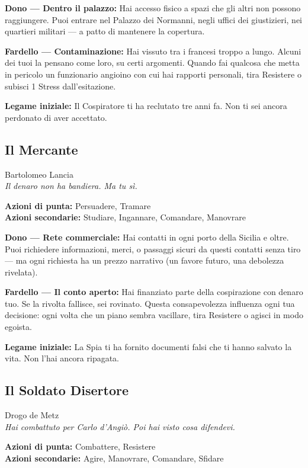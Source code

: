 \textbf{Dono — Dentro il palazzo:} Hai accesso fisico a spazi che gli
altri non possono raggiungere. Puoi entrare nel Palazzo dei Normanni,
negli uffici dei giustizieri, nei quartieri militari — a patto di
mantenere la copertura.

\textbf{Fardello — Contaminazione:} Hai vissuto tra i francesi troppo
a lungo. Alcuni dei tuoi la pensano come loro, su certi argomenti.
Quando fai qualcosa che metta in pericolo un funzionario angioino
con cui hai rapporti personali, tira Resistere o subisci 1 Stress
dall'esitazione.

\textbf{Legame iniziale:} Il Cospiratore ti ha reclutato tre anni fa.
Non ti sei ancora perdonato di aver accettato.

\filetto

\subsection{Il Mercante}
{\cinzel\footnotesize\color{grigionote} Bartolomeo Lancia}\\
\textit{Il denaro non ha bandiera. Ma tu sì.}

\textbf{Azioni di punta:} Persuadere, Tramare\\
\textbf{Azioni secondarie:} Studiare, Ingannare, Comandare, Manovrare

\textbf{Dono — Rete commerciale:} Hai contatti in ogni porto della
Sicilia e oltre. Puoi richiedere informazioni, merci, o passaggi sicuri
da questi contatti senza tiro — ma ogni richiesta ha un prezzo
narrativo (un favore futuro, una debolezza rivelata).

\textbf{Fardello — Il conto aperto:} Hai finanziato parte della
cospirazione con denaro tuo. Se la rivolta fallisce, sei rovinato.
Questa consapevolezza influenza ogni tua decisione: ogni volta che
un piano sembra vacillare, tira Resistere o agisci in modo egoista.

\textbf{Legame iniziale:} La Spia ti ha fornito documenti falsi
che ti hanno salvato la vita. Non l'hai ancora ripagata.

\filetto

\subsection{Il Soldato Disertore}
{\cinzel\footnotesize\color{grigionote} Drogo de Metz}\\
\textit{Hai combattuto per Carlo d'Angiò. Poi hai visto cosa difendevi.}

\textbf{Azioni di punta:} Combattere, Resistere\\
\textbf{Azioni secondarie:} Agire, Manovrare, Comandare, Sfidare

